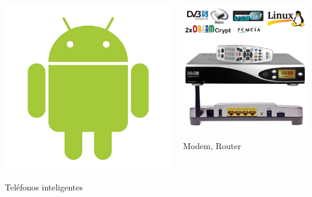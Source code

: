 \documentclass[hyperref={colorlinks}]{beamer}
\begin{document}
\begin{frame}
\begin{columns}
    \begin{column}{.25\textwidth}
        \includegraphics[width=.9\linewidth]{figs/android.png}

        \centering Tel\'efonos inteligentes
    \end{column}

    \begin{column}{.25\textwidth}
        \includegraphics[width=.9\linewidth]{figs/router-decoder.png}

        \centering Modem, Router
    \end{column}
    \end{columns}

\end{frame}
\end{document}
